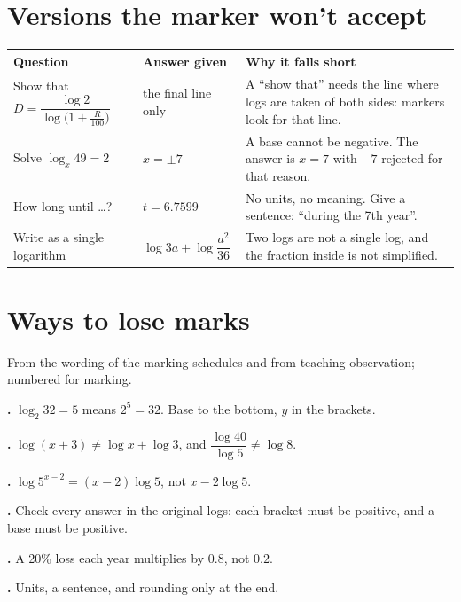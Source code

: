 \documentclass[11pt]{article}
\begin{document}
\section{Versions the marker won't accept}\label{h2:wontaccept}
\begin{tabularx}{\textwidth}{@{}>{\raggedright}p{} >{\raggedright}p{} X@{}}
\toprule
\textbf{Question} & \textbf{Answer given} & \textbf{Why it falls short} \\ \midrule
Show that $D = \dfrac{\log 2}{\log\bigl(1 + \frac{R}{100}\bigr)}$ & the final line only & A ``show that'' needs the line where logs are taken of both sides: markers look for that line. \tabularnewline
Solve $\log_{x} 49 = 2$ & $x = \pm 7$ & A base cannot be negative. The answer is $x = 7$ with $-7$ rejected for that reason. \tabularnewline
How long until \ldots? & $t = 6.7599$ & No units, no meaning. Give a sentence: ``during the 7th year''. \tabularnewline
Write as a single logarithm & $\log 3a + \log\dfrac{a^{2}}{36}$ & Two logs are not a single log, and the fraction inside is not simplified. \tabularnewline
\bottomrule
\end{tabularx}

\section{Ways to lose marks}\label{h2:lose}
From the wording of the marking schedules and from teaching observation; numbered for marking.
\begin{description}[leftmargin=10mm, labelwidth=9mm, labelsep=1mm, font=\normalfont]
\item[\textbf{\Lref{logform}}] \textbf{.} $\log_{2} 32 = 5$ means $2^{5} = 32$. Base to the bottom, $y$ in the brackets.
\item[\textbf{\Lref{loglaw}}] \textbf{.} $\log(x+3) \neq \log x + \log 3$, and $\dfrac{\log 40}{\log 5} \neq \log 8$.
\item[\textbf{\Lref{bracketpower}}] \textbf{.} $\log 5^{x-2} = (x-2)\log 5$, not $x - 2\log 5$.
\item[\textbf{\Lref{argument}}] \textbf{.} Check every answer in the original logs: each bracket must be positive, and a base must be positive.
\item[\textbf{\Lref{factor}}] \textbf{.} A 20\% loss each year multiplies by $0.8$, not $0.2$.
\item[\textbf{\Lref{context}}] \textbf{.} Units, a sentence, and rounding only at the end.
\end{description}
\end{document}
